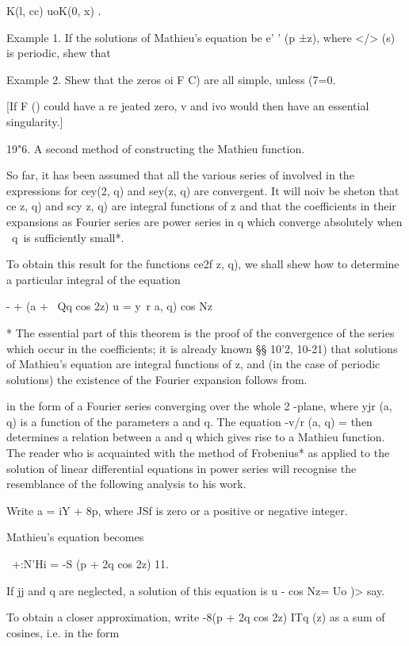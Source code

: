 K(l, cc) uoK(0, x) .

Example 1. If the solutions of Mathieu's equation be e' ' (p ±z),
where </> (s) is periodic, shew that

Example 2. Shew that the zeros oi F C) are all simple, unless (7=0.


[If F () could have a re jeated zero, v and ivo would then have an
essential singularity.]

19"6. A second method of constructing the Mathieu function.

So far, it has been assumed that all the various series of
involved in the expressions for cey(2, q) and sey(z, q) are
convergent. It will noiv be sheton that ce z, q) and scy z, q) are
integral functions of z and that the coefficients in their expansions
as Fourier series are power series in q which converge absolutely when
\ q\ is sufficiently small*.

To obtain this result for the functions ce2f z, q), we shall shew how
to determine a particular integral of the equation

- + (a + \ Qq cos 2z) u = y\ r a, q) cos Nz

* The essential part of this theorem is the proof of the convergence
of the series which occur in the coefficients; it is already known §§
10'2, 10-21) that solutions of Mathieu's equation are integral
functions of z, and (in the case of periodic solutions) the existence
of the Fourier expansion follows from.

%
%

in the form of a Fourier series converging over the whole 2 -plane,
where yjr (a, q) is a function of the parameters a and q. The equation
-v/r (a, q) = then determines a relation between a and q which gives
rise to a Mathieu function. The reader who is acquainted with the
method of Frobenius* as applied to the solution of linear differential
equations in power series will recognise the resemblance of the
following analysis to his work.

Write a = iY + 8p, where JSf is zero or a positive or negative
integer.

Mathieu's equation becomes

 \ +:N'Hi = -S (p + 2q cos 2z) 11.

If jj and q are neglected, a solution of this equation is u - cos Nz=
Uo )> say.

To obtain a closer approximation, write -8(p + 2q cos 2z) ITq (z) as a
sum of cosines, i.e. in the form


